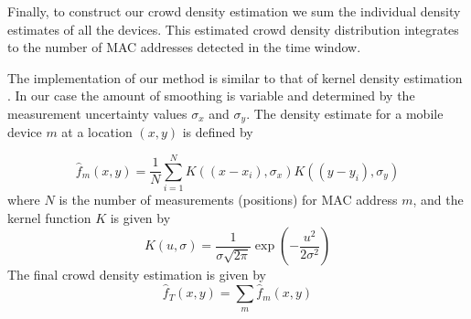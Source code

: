 \documentclass[10pt,a4paper]{article}
\begin{document}
Finally, to construct our crowd density estimation we sum the individual density estimates of all the devices.
This estimated crowd density distribution integrates to the number of MAC addresses detected in the time window.

The implementation of our method is similar to that of kernel density estimation \cite{scott}\cite{silverman}.
In our case the amount of smoothing is variable and determined by the measurement uncertainty values $\sigma_{x}$ and $\sigma_{y}$.
The density estimate for a mobile device $m$ at a location $(x,y)$ is defined by

\begin{equation}
\hat{f}_{m}(x,y)=\frac{1}{N}\sum_{i=1}^{N}K((x-x_{i}),\sigma_{x}) K((y-y_{i}),\sigma_{y})
\label{kde}
\end{equation}
where $N$ is the number of measurements (positions) for MAC address $m$, and the kernel function $K$ is given by
\begin{equation}
K(u,\sigma)=\frac{1}{\sigma\sqrt{2\pi}}\exp(-\frac{u^2}{2\sigma^2})
\end{equation}
The final crowd density estimation is given by
\begin{equation}
\hat{f}_{T}(x,y)=\sum_{m}\hat{f}_{m}(x,y)
\label{total}
\end{equation}

\end{document}
